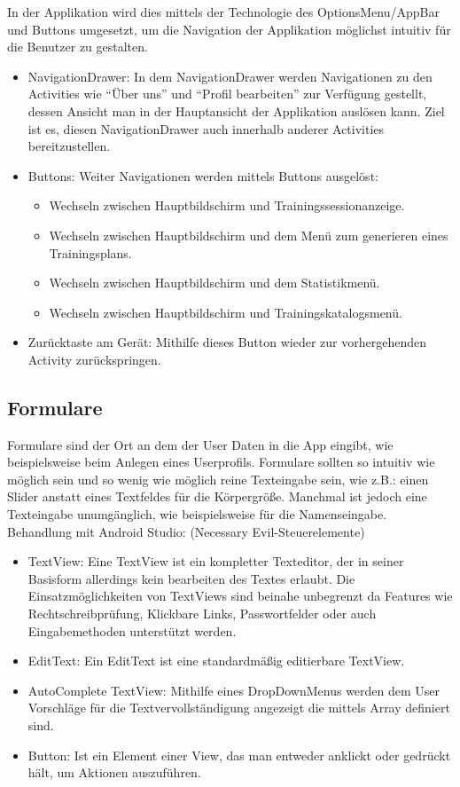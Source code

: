 \documentclass[FIPLY_base.tex]{subfiles}
\begin{document}
In der Applikation wird dies mittels der Technologie des OptionsMenu/AppBar und Buttons umgesetzt, um die Navigation der Applikation möglichst intuitiv für die Benutzer zu gestalten. 
\begin{itemize}
	\item NavigationDrawer: In dem NavigationDrawer werden Navigationen zu den Activities wie  “Über uns” und “Profil bearbeiten” zur Verfügung gestellt, dessen Ansicht man in der Hauptansicht der Applikation auslösen kann. Ziel ist es, diesen NavigationDrawer auch innerhalb anderer Activities bereitzustellen.
	\item Buttons: Weiter Navigationen werden mittels Buttons ausgelöst:
	\begin{itemize}
		\item Wechseln zwischen Hauptbildschirm und Trainingssessionanzeige.
		\item Wechseln zwischen Hauptbildschirm und dem Menü zum generieren eines Trainingsplans.
		\item Wechseln zwischen Hauptbildschirm und dem Statistikmenü.
		\item Wechseln zwischen Hauptbildschirm und Trainingskatalogsmenü.
	\end{itemize}
	\item Zurücktaste am Gerät: Mithilfe dieses Button wieder zur vorhergehenden Activity zurückspringen.
\end{itemize}

\subsection{Formulare}
Formulare sind der Ort an dem der User Daten in die App eingibt, wie beispielsweise beim Anlegen eines Userprofils. Formulare sollten so intuitiv wie möglich sein und so wenig wie möglich reine Texteingabe sein, wie z.B.: einen Slider anstatt eines Textfeldes für die Körpergröße. Manchmal ist jedoch eine Texteingabe unumgänglich, wie beispielsweise für die Namenseingabe.
Behandlung mit Android Studio: (Necessary Evil-Steuerelemente)

\begin{itemize}
	\item TextView: Eine TextView ist ein kompletter Texteditor, der in seiner Basisform allerdings kein bearbeiten des Textes erlaubt. Die Einsatzmöglichkeiten von TextViews sind beinahe unbegrenzt da Features wie Rechtschreibprüfung, Klickbare Links, Passwortfelder oder auch Eingabemethoden unterstützt werden.
	\item EditText: Ein EditText ist eine standardmäßig editierbare TextView.
	\item AutoComplete TextView: Mithilfe eines DropDownMenus werden dem User Vorschläge für die Textvervollständigung angezeigt die mittels Array definiert sind.
	\item Button: Ist ein Element einer View, das man entweder anklickt oder gedrückt hält, um Aktionen auszuführen.
\end{itemize}
\end{document}
